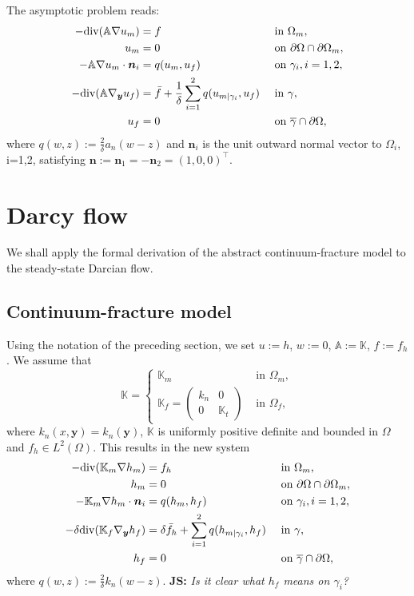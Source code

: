 \documentclass[a4paper]{article}
\def\vc#1{\mathbf{\boldsymbol{#1}}}     %
\def\tn#1{{\mathbb{#1}}}    %
\def\div{{\rm div}}
\def\yy{{\vc y}}
\newcommand{\note}[2]{{\color{blue} \textbf{ #1:} \textit{#2}}}
\begin{document}
The asymptotic problem reads:
\begin{subequations}
\label{eq:asymptotic_pde}
\begin{align}
-\div(\tn A\nabla u_m) &= f &&\mbox{ in }\Omega_m,\\
u_m &= 0 &&\mbox{ on }\partial\Omega\cap\partial\Omega_m,\\
-\tn A\nabla u_m\cdot\vc n_i &= q(u_m,u_f) &&\mbox{ on }\gamma_i,i=1,2,\\
-\div(\tn A\nabla_\yy u_f) &= \bar f + \frac1\delta\sum_{i=1}^2 q(u_{m|\gamma_i},u_f) &&\mbox{ in }\gamma,\\
u_f &= 0 &&\mbox{ on }\overline\gamma\cap\partial\Omega,
\end{align}
\end{subequations}
where $q(w,z):=\frac2\delta a_n(w-z)$ and $\vc n_i$ is the unit outward normal vector to $\Omega_i$, i=1,2, satisfying $\vc n:=\vc n_1=-\vc n_2=(1,0,0)^\top$.




\section{Darcy flow}

We shall apply the formal derivation of the abstract continuum-fracture model to the steady-state Darcian flow.

\subsection{Continuum-fracture model}

Using the notation of the preceding section, we set $u:=h$, $w:=0$, $\tn A:=\tn K$, $f:=f_h$.
We assume that
\[ \tn K = \begin{cases}\tn K_m & \mbox{ in }\Omega_m,\\ \tn K_f = \begin{pmatrix}k_n & 0\\0&\tn K_t\end{pmatrix} & \mbox{ in }\Omega_f,\end{cases} \]
where $k_n(x,\yy)=k_n(\yy)$, $\tn K$ is uniformly positive definite and bounded in $\Omega$ and $f_h\in L^2(\Omega)$.
This results in the new system
\begin{subequations}
\label{eq:asymptotic_darcy}
\begin{align}
-\div(\tn K_m\nabla h_m) &= f_h &&\mbox{ in }\Omega_m,\\
h_m &= 0 &&\mbox{ on }\partial\Omega\cap\partial\Omega_m,\\
-\tn K_m\nabla h_m\cdot\vc n_i &= q(h_m,h_f) &&\mbox{ on }\gamma_i,i=1,2,\\
-\delta\div(\tn K_f\nabla_\yy h_f) &= \delta\bar f_h + \sum_{i=1}^2 q(h_{m|\gamma_i},h_f) &&\mbox{ in }\gamma,\\
h_f &= 0 &&\mbox{ on }\overline\gamma\cap\partial\Omega,
\end{align}
\end{subequations}
where $q(w,z):=\frac2\delta k_n(w-z)$.
\note{JS}{Is it clear what $h_f$ means on $\gamma_i$?}
\end{document}
